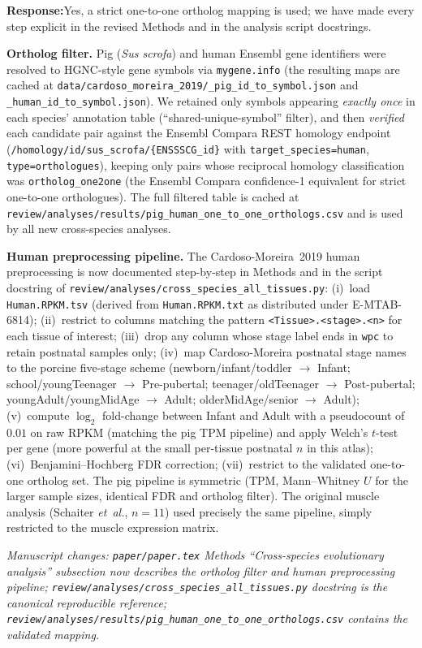 \documentclass[11pt,a4paper]{article}
\newcommand{\response}[1]{%
  \par\vspace{2pt}\noindent\textbf{\textcolor{respcolor}{Response:}}\;\;#1\par\vspace{6pt}}
\newcommand{\changeloc}[1]{\par\noindent\textit{\small Manuscript changes: #1}\par}
\begin{document}
\response{Yes, a strict one-to-one ortholog mapping is used; we have made
every step explicit in the revised Methods and in the analysis script
docstrings.

\textbf{Ortholog filter.} Pig (\emph{Sus scrofa}) and human Ensembl gene
identifiers were resolved to HGNC-style gene symbols via
\texttt{mygene.info} (the resulting maps are cached at
\texttt{data/cardoso\_moreira\_2019/\_pig\_id\_to\_symbol.json} and
\texttt{\_human\_id\_to\_symbol.json}). We retained only symbols
appearing \emph{exactly once} in each species' annotation table
(``shared-unique-symbol'' filter), and then \emph{verified} each
candidate pair against the Ensembl Compara REST homology endpoint
(\texttt{/homology/id/sus\_scrofa/\{ENSSSCG\_id\}} with
\texttt{target\_species=human}, \texttt{type=orthologues}), keeping
only pairs whose reciprocal homology classification was
\texttt{ortholog\_one2one} (the Ensembl Compara confidence-1 equivalent
for strict one-to-one orthologues). The full filtered table is cached at
\texttt{review/analyses/results/pig\_human\_one\_to\_one\_orthologs.csv}
and is used by all new cross-species analyses.

\textbf{Human preprocessing pipeline.} The Cardoso-Moreira~2019 human
preprocessing is now documented step-by-step in Methods and in the
script docstring of
\texttt{review/analyses/cross\_species\_all\_tissues.py}: (i)~load
\texttt{Human.RPKM.tsv} (derived from \texttt{Human.RPKM.txt} as
distributed under E-MTAB-6814); (ii)~restrict to columns matching the
pattern \texttt{<Tissue>.<stage>.<n>} for each tissue of interest;
(iii)~drop any column whose stage label ends in \texttt{wpc} to retain
postnatal samples only; (iv)~map Cardoso-Moreira postnatal stage names
to the porcine five-stage scheme
(newborn/infant/toddler $\rightarrow$ Infant;
school/youngTeenager $\rightarrow$ Pre-pubertal;
teenager/oldTeenager $\rightarrow$ Post-pubertal;
youngAdult/youngMidAge $\rightarrow$ Adult;
olderMidAge/senior $\rightarrow$ Adult); (v)~compute $\log_2$
fold-change between Infant and Adult with a pseudocount of $0.01$ on
raw RPKM (matching the pig TPM pipeline) and apply Welch's $t$-test per
gene (more powerful at the small per-tissue postnatal $n$ in this
atlas); (vi)~Benjamini--Hochberg FDR correction; (vii)~restrict to the
validated one-to-one ortholog set. The pig pipeline is symmetric (TPM,
Mann--Whitney $U$ for the larger sample sizes, identical FDR and
ortholog filter). The original muscle analysis (Schaiter
\textit{et~al.}, $n = 11$) used precisely the same pipeline, simply
restricted to the muscle expression matrix.}
\changeloc{\texttt{paper/paper.tex} Methods ``Cross-species evolutionary
analysis'' subsection now describes the ortholog filter and human
preprocessing pipeline; \texttt{review/analyses/cross\_species\_all\_tissues.py}
docstring is the canonical reproducible reference;
\texttt{review/analyses/results/pig\_human\_one\_to\_one\_orthologs.csv}
contains the validated mapping.}
\end{document}
